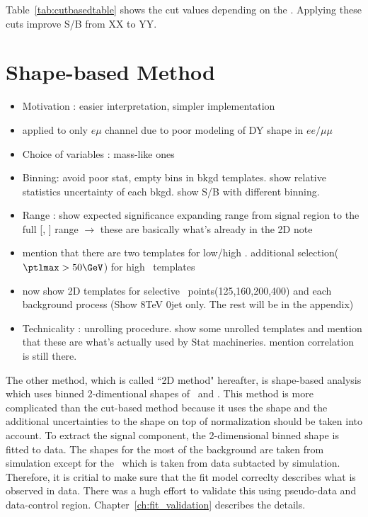 Table~\ref{tab:cutbasedtable} shows the cut values depending on the \mHi. 
Applying these cuts improve S/B from XX to YY. 






\section{Shape-based Method}
\begin{itemize} 
\item Motivation : easier interpretation, simpler implementation  
\item applied to only $e\mu$ channel due to poor modeling of DY shape in $ee/\mu\mu$   
\item Choice of variables : mass-like ones
\item Binning: avoid poor stat, empty bins in bkgd templates. 
      show relative statistics uncertainty of each bkgd. 
      show S/B with different binning. 
\item Range : show expected significance expanding range from signal region to the full 
      [\mT, \mll] range $\rightarrow$ these are basically what's already in the 2D note 
\item mention that there are two templates for low/high \mHi. 
      additional selection($\ptlmax>50\GeV$) for high \mHi~templates
\item now show 2D templates for selective \mHi~points(125,160,200,400) and each background process
      (Show 8TeV 0jet only. The rest will be in the appendix)
\item Technicality : unrolling  procedure. show some unrolled templates and mention that 
      these are what's actually used by Stat machineries. mention correlation is still there. 
\end{itemize}  

The other method, which is called ``2D method" hereafter, 
is shape-based analysis which uses binned 2-dimentional shapes 
of \mT\ and \mll. This method is more complicated than the cut-based method
because it uses the shape and the additional uncertainties to the shape 
on top of normalization should be taken into account. 
To extract the signal component, the 2-dimensional binned shape is fitted to data. 
The shapes for the most of the background are taken from simulation except for 
the \Wjets\ which is taken from data subtacted by simulation. 
Therefore, it is critial to make sure that the fit model correclty describes 
what is observed in data. There was a hugh effort to validate this using 
pseudo-data and data-control region. Chapter~\ref{ch:fit_validation} describes 
the details. 

